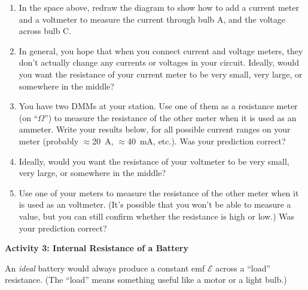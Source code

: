 \begin{enumerate}[labparts]
 
\item In the space above, redraw the diagram to show how to add a current meter and a voltmeter to measure the current through bulb A, and the voltage across bulb C.

\item In general, you hope that when you connect current and voltage meters, they don't actually change any currents or voltages in your circuit.  Ideally, would you want the resistance of your current meter to be very small, very large, or somewhere in the middle?

\answerspace{0.5in}

\item You have two DMMs at your station.  Use one of them as a resistance meter (on ``$\Omega$'') to measure the resistance of the other meter when it is used as an ammeter.  Write your results below, for all possible current ranges on your meter (probably $\approx$20~A, $\approx$40~mA, etc.).  Was your prediction correct?

\answerspace{0.9in}

\item Ideally, would you want the resistance of your voltmeter to be very small, very large, or somewhere in the middle?

\answerspace{0.5in}

\item Use one of your meters to measure the resistance of the other meter when it is used as an voltmeter.  (It's possible that you won't be able to measure a value, but you can still confirm whether the resistance is high or low.)  Was your prediction correct?

\answerspace{0.9in}

\end{enumerate}

\pagebreak[3]

\textbf{Activity 3: Internal Resistance of a Battery}

An \textit{ideal} battery would always produce a constant emf $\mathcal{E}$ across a ``load'' resistance.  (The ``load'' means something useful like a motor or a light bulb.)  

